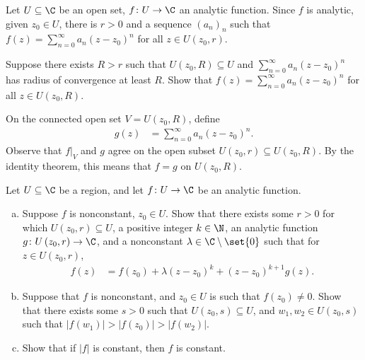 \documentclass[10pt]{mypackage}
\begin{document}
\begin{problem}
  Let $U\subseteq \C$ be an open set, $f\colon U\rightarrow \C$ an analytic function. Since $f$ is analytic, given $z_0\in U$, there is $r > 0$ and a sequence $\left( a_n \right)_n$ such that $f(z) = \sum_{n=0}^{\infty}a_n\left( z-z_0 \right)^{n}$ for all $z\in U\left( z_0,r \right)$.\newline

  Suppose there exists $R > r$ such that $U\left( z_0,R \right) \subseteq U$ and $\sum_{n=0}^{\infty}a_n\left( z-z_0 \right)^{n}$ has radius of convergence at least $R$. Show that $f(z) = \sum_{n=0}^{\infty}a_n\left( z-z_0 \right)^{n}$ for all $z\in U\left( z_0,R \right)$.
\end{problem}
\begin{solution}
  On the connected open set $V = U\left( z_0,R \right)$, define
  \begin{align*}
    g(z) &= \sum_{n=0}^{\infty}a_n\left( z-z_0 \right)^{n}.
  \end{align*}
  Observe that $f|_{V}$ and $g$ agree on the open subset $U\left( z_0,r \right)\subseteq U\left( z_0,R \right)$. By the identity theorem, this means that $f = g$ on $U\left( z_0,R \right)$.
\end{solution}
\begin{problem}
  Let $U\subseteq \C$ be a region, and let $f\colon U\rightarrow \C$ be an analytic function.
  \begin{enumerate}[(a)]
    \item Suppose $f$ is nonconstant, $z_0\in U$. Show that there exists some $r > 0$ for which $U\left( z_0,r \right)\subseteq U$, a positive integer $k\in \N$, an analytic function $g\colon U\left( z_0,r \right)\rightarrow \C$, and a nonconstant $\lambda\in \C\setminus \set{0}$ such that for $z\in U\left( z_0,r \right)$,
      \begin{align*}
        f(z) &= f\left(z_0\right) + \lambda\left( z-z_0 \right)^{k} + \left( z-z_0 \right)^{k+1} g(z).
      \end{align*}
    \item Suppose that $f$ is nonconstant, and $z_0\in U$ is such that $f\left( z_0 \right) \neq 0$. Show that there exists some $s > 0$ such that $U\left( z_0,s \right)\subseteq U$, and $w_1,w_2\in U\left( z_0,s \right)$ such that $\left\vert f\left( w_1 \right) \right\vert > \left\vert f\left( z_0 \right) \right\vert > \left\vert f\left( w_2 \right) \right\vert$.
    \item Show that if $\left\vert f \right\vert$ is constant, then $f$ is constant.
  \end{enumerate}
\end{problem}
\end{document}
